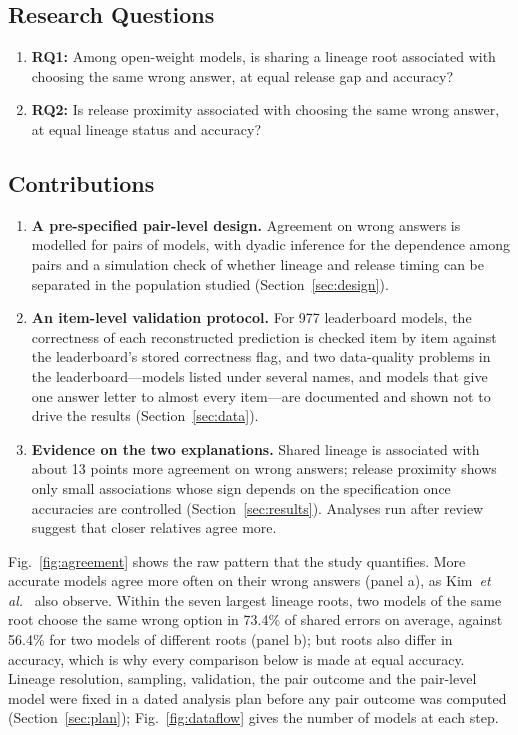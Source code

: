 \documentclass{ieeeaccess}
\theoremstyle{definition}
\theoremstyle{plain}
\begin{document}
\subsection{Research Questions}
\begin{enumerate}
\item \textbf{RQ1:} Among open-weight models, is sharing a lineage root associated with choosing the same wrong answer, at equal release gap and accuracy?
\item \textbf{RQ2:} Is release proximity associated with choosing the same wrong answer, at equal lineage status and accuracy?
\end{enumerate}

\subsection{Contributions}
\begin{enumerate}
\item \textbf{A pre-specified pair-level design.} Agreement on wrong answers is modelled for pairs of models, with dyadic inference for the dependence among pairs and a simulation check of whether lineage and release timing can be separated in the population studied (Section~\ref{sec:design}).
\item \textbf{An item-level validation protocol.} For 977 leaderboard models, the correctness of each reconstructed prediction is checked item by item against the leaderboard's stored correctness flag, and two data-quality problems in the leaderboard---models listed under several names, and models that give one answer letter to almost every item---are documented and shown not to drive the results (Section~\ref{sec:data}).
\item \textbf{Evidence on the two explanations.} Shared lineage is associated with about 13 points more agreement on wrong answers; release proximity shows only small associations whose sign depends on the specification once accuracies are controlled (Section~\ref{sec:results}). Analyses run after review suggest that closer relatives agree more.
\end{enumerate}

Fig.~\ref{fig:agreement} shows the raw pattern that the study quantifies. More accurate models agree more often on their wrong answers (panel a), as Kim~\textit{et al.}~\cite{kim2025} also observe. Within the seven largest lineage roots, two models of the same root choose the same wrong option in 73.4\% of shared errors on average, against 56.4\% for two models of different roots (panel b); but roots also differ in accuracy, which is why every comparison below is made at equal accuracy. Lineage resolution, sampling, validation, the pair outcome and the pair-level model were fixed in a dated analysis plan before any pair outcome was computed (Section~\ref{sec:plan}); Fig.~\ref{fig:dataflow} gives the number of models at each step.
\end{document}
